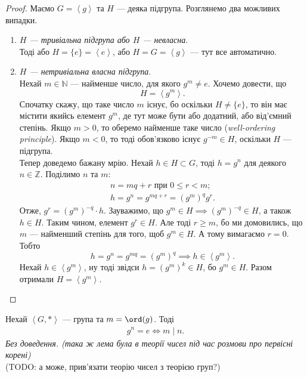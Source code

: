 \documentclass{math_library}
\begin{document}
\begin{proof}
Маємо $G = \left<g\right>$ та $H$ --- деяка підгрупа. Розглянемо два можливих випадки.
\begin{enumerate}[wide=0pt,label={\Roman*.}]
\item \textit{$H$ --- тривіальна підгрупа або $H$ --- невласна}. \\
Тоді або $H = \{e\} = \left<e\right>$, або $H = G = \left<g\right>$ --- тут все автоматично.

\item \textit{$H$ --- нетривіальна власна підгрупа}.\\
Нехай $m \in \mathbb{N}$ --- найменше число, для якого $g^m \neq e$. Хочемо довести, що
\[
H = \left< g^m \right>.
\]
Спочатку скажу, що таке число $m$ існує, бо оскільки $H \neq \{e\}$, то він має містити якийсь елемент $g^m$, де тут може бути або додатний, або від'ємний степінь. Якщо $m > 0$, то оберемо найменше таке число (\textit{well-ordering principle}). Якщо $m < 0$, то тоді обов'язково існує $g^{-m} \in H$, оскільки $H$ --- підгрупа.
\bigskip \\
Тепер доведемо бажану мрію. Нехай $h \in H \subset G$, тоді $h = g^n$ для деякого $n \in \mathbb{Z}$. Поділимо $n$ та $m$:
\begin{align*}
n = mq + r \text{ при } 0 \leq r < m;\\
h = g^n = g^{mq+r} = (g^m)^q g^r.
\end{align*}
Отже, $g^r = (g^m)^{-q} \cdot h$. Зауважимо, що $g^m \in H \implies (g^m)^{-q} \in H$, а також $h \in H$. Таким чином, елемент $g^r \in H$. Але тоді $r \geq m$, бо ми домовились, що $m$ --- найменший степінь для того, щоб $g^m \in H$. А тому вимагаємо $r = 0$. Тобто \[
h = g^n = g^{mq} = (g^m)^q \implies h \in \left<g^m\right>. 
\]
Нехай $h \in \left<g^m\right>$, ну тоді звідси $h = (g^m)^k \in H$, бо $g^m \in H$.
Разом отримали $H = \left<g^m\right>$. \qedhere
\end{enumerate}
\end{proof}

\begin{lemma}
Нехай $\left< G,* \right>$ --- група та $m = \ord (g)$. Тоді 
\begin{align*}
g^n = e \iff m \mid n.
\end{align*}
\textit{Без доведення. (така ж лема була в теорії чисел під час розмови про первісні корені)}\\
(TODO: а може, прив'язати теорію чисел з теорією груп?)
\end{lemma}
\end{document}

